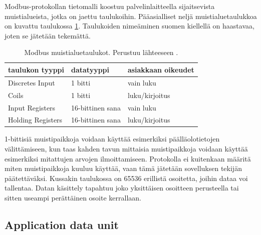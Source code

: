  Modbus-protokollan tietomalli koostuu palvelinlaitteella sijaitsevista muistialueista, jotka on jaettu taulukoihin. Pääasialliset neljä muistialuetaulukkoa on kuvattu taulukossa \ref{taulukot}. Taulukoiden nimeäminen suomen kiellellä on haastavaa, joten se jätetään tekemättä.
  \begin{table}[h]
    \centering
    \caption[Modbus muistialuetaulukot.]{Modbus muistialuetaulukot. Perustuu lähteeseen \parencite{modbusAppSpec}.}
    \begin{tabular}{|l|l|l|}
      \hline
      \rowcolor{gray} taulukon tyyppi         & datatyyppi      & asiakkaan oikeudet  \\ \hline
      \cellcolor{lightgray}Discretes Input    & 1 bitti          & vain luku           \\ \hline
      \cellcolor{lightgray}Coils              & 1 bitti          & luku/kirjoitus      \\ \hline
      \cellcolor{lightgray}Input Registers    & 16-bittinen sana & vain luku           \\ \hline
      \cellcolor{lightgray}Holding Registers  & 16-bittinen sana & luku/kirjoitus      \\ \hline
    \end{tabular}
    \label{taulukot}
  \end{table}
  1-bittisiä muistipaikkoja voidaan käyttää esimerkiksi päälläolotietojen välittämiseen, kun taas kahden tavun mittaisia muistipaikkoja voidaan käyttää esimerkiksi mitattujen arvojen ilmoittamiseen. Protokolla ei kuitenkaan määritä miten muistipaikkoja kuuluu käyttää, vaan tämä jätetään sovelluksen tekijän päätettäväksi. Kussakin taulukossa on 65536 erillistä osoitetta, joihin dataa voi tallentaa. Datan käsittely tapahtuu joko yksittäisen osoitteen perusteella tai sitten useampi perättäinen osoite kerrallaan.\parencite{modbusAppSpec}

  \subsection{Application data unit}

